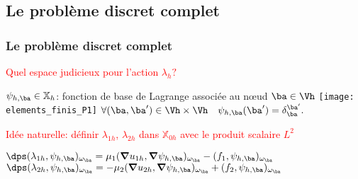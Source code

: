 \documentclass{beamer}
\begin{document}
\subsection{Le problème discret complet}
\begin{frame}
\frametitle{Le problème discret complet}
\textcolor{red}{Quel espace judicieux pour l'action $\lambda_h?$}
\begin{definition}
$\psi_{h,\ba} \in {\mathbb{X}}_h$: fonction de base de Lagrange associée au nœud ${\ba} \in \Vh$ %
\texttt{[image: elements\_finis\_P1]}
\quad $\forall ({\ba},{\ba}') \in \Vh \times \Vh \quad \psi_{h,\ba}({\ba}')=\delta_{\ba}^{\ba'}.$
\end{definition}
\textcolor{red}{Idée naturelle: définir $\lambda_{1h}$, $\lambda_{2h}$ dans $\mathbb{X}_{0h}$ avec le produit scalaire $L^2$}

$\dps (\lambda_{1h},\psi_{h,\ba})_{\omega_{\ba}}=\mu_1 ({\bm \nabla} u_{1h},{\bm \nabla} \psi_{h,\ba})_{\omega_{\ba}}-(f_1,\psi_{h,\ba})_{\omega_{\ba}}$
\vspace{1 cm} 
$\dps (\lambda_{2h},\psi_{h,\ba})_{\omega_{\ba}}=-\mu_2 ({\bm \nabla} u_{
2h},{\bm \nabla} \psi_{h,\ba})_{\omega_{\ba}}+ (f_2,\psi_{h,\ba})_{\omega_{\ba}}$ 
\end{frame}
\end{document}
